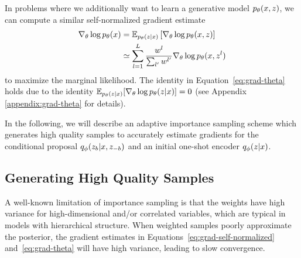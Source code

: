 \documentclass{article}
\theoremstyle{definition}
\begin{document}
In problems where we additionally want to learn a generative model $p_\theta(x, z)$, we can compute a similar self-normalized gradient estimate 
\begin{align}
    \nabla_\theta \log p_\theta(x) 
    &=
    \mathbb{E}_{p_\theta(z | x)} 
    \left[
    \nabla_\theta \log p_\theta(x, z)
    \right] \label{eq:grad-theta}\\
    &
    \simeq
    \sum_{l=1}^L
    \frac{w^l}{\sum_{l'} w^{l'}}
    \nabla_\theta
    \log p_\theta(x, z^l)
    \nonumber
\end{align}
to maximize the marginal likelihood.
The identity in Equation~\ref{eq:grad-theta} holds due to the identity \mbox{$\mathbb{E}_{p_\theta(z|x)}[\nabla_\theta \log p_\theta(z|x)]=0$} (see Appendix \ref{appendix:grad-theta} for details). 

In the following, we will describe an adaptive importance sampling scheme which generates high quality samples to accurately estimate gradients for the conditional proposal $q_\phi(z_b | x, z_{-b})$ and an initial one-shot encoder $q_\phi(z | x)$.

\subsection{Generating High Quality Samples}
A well-known limitation of importance sampling is that the weights have high variance for high-dimensional and/or correlated variables, which are typical in models with hierarchical structure. When weighted samples poorly approximate the posterior, the gradient estimates in Equations~\ref{eq:grad-self-normalized} and~\ref{eq:grad-theta} will have high variance, leading to slow convergence.

\end{document}
